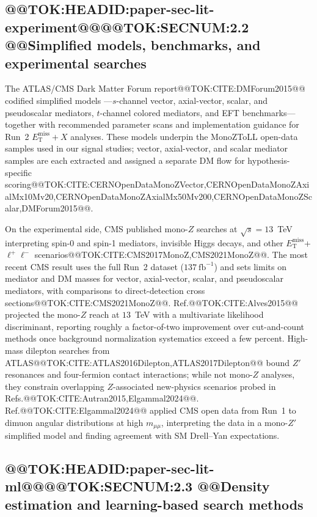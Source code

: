\documentclass[11pt]{article}
\newcommand{\MET}{\ensuremath{E_{\mathrm{T}}^{\mathrm{miss}}}}
\begin{document}
\subsection{@@TOK:HEADID:paper-sec-lit-experiment@@@@TOK:SECNUM:2.2 @@Simplified models, benchmarks, and experimental searches}

The ATLAS/CMS Dark Matter Forum report@@TOK:CITE:DMForum2015@@ codified simplified models
---$s$-channel vector, axial-vector, scalar, and pseudoscalar mediators, $t$-channel
colored mediators, and EFT benchmarks---together with recommended parameter scans and
implementation guidance for Run~2 $\MET+X$ analyses.
These models underpin the MonoZToLL open-data samples used in our signal studies; vector,
axial-vector, and scalar mediator samples are each extracted and assigned a separate DM
flow for hypothesis-specific scoring@@TOK:CITE:CERNOpenDataMonoZVector,CERNOpenDataMonoZAxialMx10Mv20,CERNOpenDataMonoZAxialMx50Mv200,CERNOpenDataMonoZScalar,DMForum2015@@.

On the experimental side, CMS published mono-$Z$ searches at $\sqrt{s}=13$~TeV interpreting
spin-0 and spin-1 mediators, invisible Higgs decays, and other $\MET$+$\ell^+\ell^-$
scenarios@@TOK:CITE:CMS2017MonoZ,CMS2021MonoZ@@.
The most recent CMS result uses the full Run~2 dataset ($137~\mathrm{fb}^{-1}$) and sets
limits on mediator and DM masses for vector, axial-vector, scalar, and pseudoscalar
mediators, with comparisons to direct-detection cross sections@@TOK:CITE:CMS2021MonoZ@@.
Ref.@@TOK:CITE:Alves2015@@ projected the mono-$Z$ reach at $13$~TeV with a multivariate
likelihood discriminant, reporting roughly a factor-of-two improvement over cut-and-count
methods once background normalization systematics exceed a few percent.
High-mass dilepton searches from ATLAS@@TOK:CITE:ATLAS2016Dilepton,ATLAS2017Dilepton@@ bound
$Z'$ resonances and four-fermion contact interactions; while not mono-$Z$ analyses, they
constrain overlapping $Z$-associated new-physics scenarios probed in
Refs.@@TOK:CITE:Autran2015,Elgammal2024@@.
Ref.@@TOK:CITE:Elgammal2024@@ applied CMS open data from Run~1 to dimuon angular distributions
at high $m_{\mu\mu}$, interpreting the data in a mono-$Z'$ simplified model and finding
agreement with SM Drell--Yan expectations.

\subsection{@@TOK:HEADID:paper-sec-lit-ml@@@@TOK:SECNUM:2.3 @@Density estimation and learning-based search methods}
\end{document}
